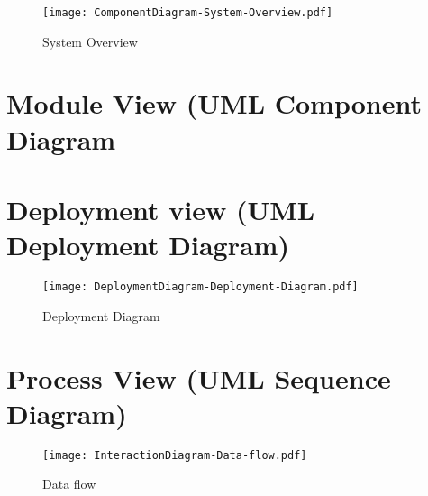 
\begin{figure}[!htp]
  \centering
  \texttt{[image: ComponentDiagram-System-Overview.pdf]}
  \caption[System Overview]{System Overview \label{diag:Component:SystemOverview}}
\end{figure}



\chapter{Module View (UML Component Diagram}
\minilof{}






\chapter{Deployment view (UML Deployment Diagram)}
\minilof{}





\begin{figure}[!htp]
  \centering
  \texttt{[image: DeploymentDiagram-Deployment-Diagram.pdf]}
  \caption[Deployment Diagram]{Deployment Diagram \label{diag:Deployment:DeploymentDiagram}}
\end{figure}



\chapter{Process View (UML Sequence Diagram)}
\minilof{}



\begin{figure}[!htp]
  \centering
  \texttt{[image: InteractionDiagram-Data-flow.pdf]}
  \caption[Data flow]{Data flow \label{diag:Interaction:Dataflow}}
\end{figure}
